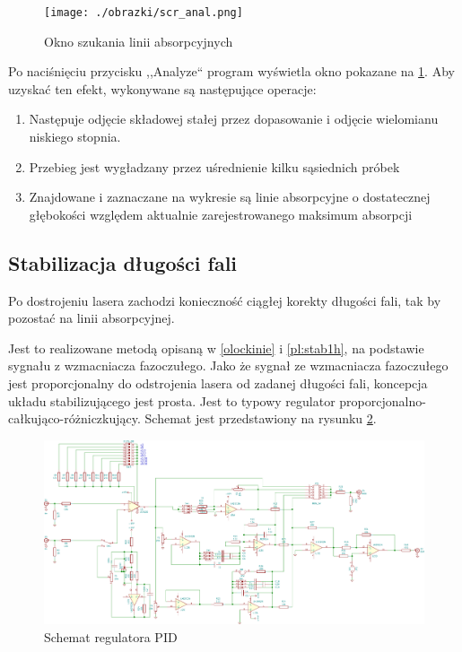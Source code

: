 \documentclass[a4paper,10pt]{article}
\begin{document}
\begin{figure}
\begin{center}
 \texttt{[image: ./obrazki/scr\_anal.png]}
\end{center}
\caption{Okno szukania linii absorpcyjnych}
\label{scr-anal}
\end{figure}

Po naciśnięciu przycisku ,,Analyze`` program wyświetla okno pokazane na \ref{scr-anal}.
Aby uzyskać ten efekt, wykonywane są następujące operacje:
\begin{enumerate}
 \item Następuje odjęcie składowej stałej przez dopasowanie i odjęcie wielomianu niskiego stopnia.
 \item Przebieg jest wygładzany przez uśrednienie kilku sąsiednich próbek
 \item Znajdowane i zaznaczane na wykresie są linie absorpcyjne o dostatecznej głębokości względem aktualnie zarejestrowanego maksimum absorpcji
\end{enumerate}





\subsection{Stabilizacja długości fali}

Po dostrojeniu lasera zachodzi konieczność ciągłej korekty długości fali, tak by pozostać na linii absorpcyjnej.

Jest to realizowane metodą opisaną w \ref{olockinie} i \ref{pl:stab1h}, na podstawie sygnału z wzmacniacza fazoczułego. %
Jako że sygnał ze wzmacniacza fazoczułego jest proporcjonalny do odstrojenia lasera od zadanej długości fali, koncepcja układu stabilizującego jest prosta.
Jest to typowy regulator proporcjonalno-całkująco-różniczkujący. Schemat jest przedstawiony na rysunku \ref{sch-pid}.

\begin{figure}
\begin{center}
 \includegraphics[scale=0.58, angle =90 ]{./obrazki/pidella.pdf}
\end{center}
\caption{Schemat regulatora PID}
\label{sch-pid}
\end{figure}
\end{document}
